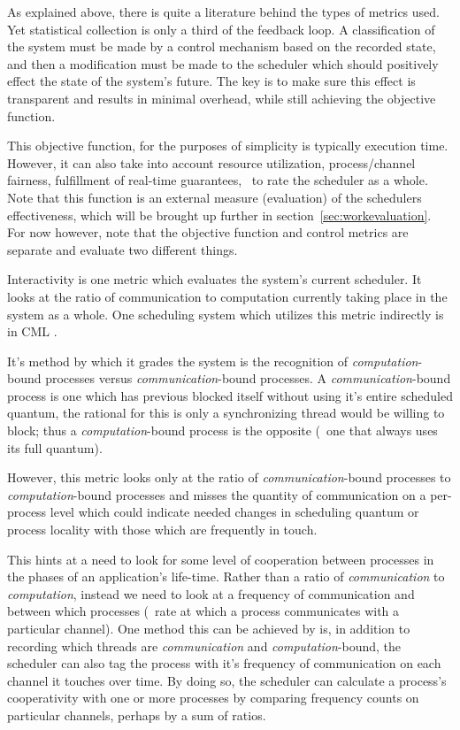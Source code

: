 
As explained above, there is quite a literature behind the types of metrics used. Yet statistical collection is 
only a third of the feedback loop. A classification of the system must be made by a control mechanism based on the 
recorded state, and then a modification must be made to the scheduler which should positively 
effect the state of the system's future. The key is to make sure this effect is transparent and results in minimal
overhead, while still achieving the objective function.

This objective function, for the purposes of simplicity is typically execution time. However, it can also take into
account resource utilization, process/channel fairness, fulfillment of real-time guarantees, \etc~to rate the 
scheduler as a whole. Note that this function is an external measure (evaluation) of the schedulers effectiveness,
which will be brought up further in section~\ref{sec:workevaluation}. For now however, note that the objective 
function and control metrics are separate and evaluate two different things.

Interactivity is one metric which evaluates the system's current scheduler. It looks at the ratio of communication
to computation currently taking place in the system as a whole. One scheduling system which utilizes this metric 
indirectly is in CML \cite{reppy1993concurrent}.

It's method by which it grades the system is the recognition of {\em computation}-bound processes versus
{\em communication}-bound processes. A {\em communication}-bound process is one which has previous blocked itself
without using it's entire scheduled quantum, the rational for this is only a synchronizing thread would be willing
to block; thus a {\em computation}-bound process is the opposite (\ie~one that always uses its full quantum). 

However, this metric looks only at the ratio of {\em communication}-bound processes to {\em computation}-bound
processes and misses the quantity of communication on a per-process level which could indicate needed changes in
scheduling quantum or process locality with those which are frequently in touch.

This hints at a need to look for some level of cooperation between processes in the phases of an application's
life-time. Rather than a ratio of {\em communication} to {\em computation}, instead we need to look at a 
frequency of communication and between which processes (\ie~rate at which a process communicates with a particular
channel). One method this can be achieved by is, in addition to recording which threads are {\em communication} and 
{\em computation}-bound, the scheduler can also tag the process with it's frequency of communication on each 
channel it touches over time. By doing so, the scheduler can calculate a process's cooperativity with one or more
processes by comparing frequency counts on particular channels, perhaps by a sum of ratios.

